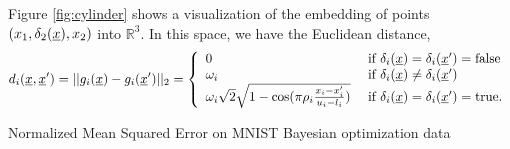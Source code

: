 \documentclass[landscape,a0b,final,a4resizeable]{include/a0poster}
\newcommand{\vect}[1]{\underline{\smash{#1}}}
\renewcommand{\v}[1]{\vect{#1}}
\newcommand{\reals}{\mathds{R}}
\newcommand{\br}{}%
\newcommand{\embeddingletter}{g}
\begin{document}
\begin{poster}
\begin{multicols}{3}
Figure \ref{fig:cylinder} shows a visualization of the embedding of points $(x_1, \delta_2(\v{x}), x_2)$ into $\reals^3$. 
%
In this space, we have the Euclidean distance,
%
\begin{equation}
d\br_i(\v{x}, \v{x}') = ||\embeddingletter_i\br(\v{x})-\embeddingletter_i\br(\v{x}')||_2 =\left\{\begin{array}{ll}
0 & \textrm{ if } \delta_i(\v{x}) = \delta_i(\v{x}') = \textrm{false}\\
\omega_i & \textrm{ if } \delta_i(\v{x}) \neq \delta_i(\v{x}')\\
\omega_i \sqrt{2} \sqrt{1 - \cos(\pi\rho_i \frac{x_i-x_i'}{u_i-l_i})} & \textrm{ if } \delta_i(\v{x}) = \delta_i(\v{x}') = \textrm{true}. \end{array}\right.
\label{eq:distance}
\end{equation}







\newpage





\begin{minipage}[c]{0.95\columnwidth}


Normalized Mean Squared Error on MNIST Bayesian optimization data
%
\end{minipage}






\end{multicols}
\end{poster}
\end{document}
